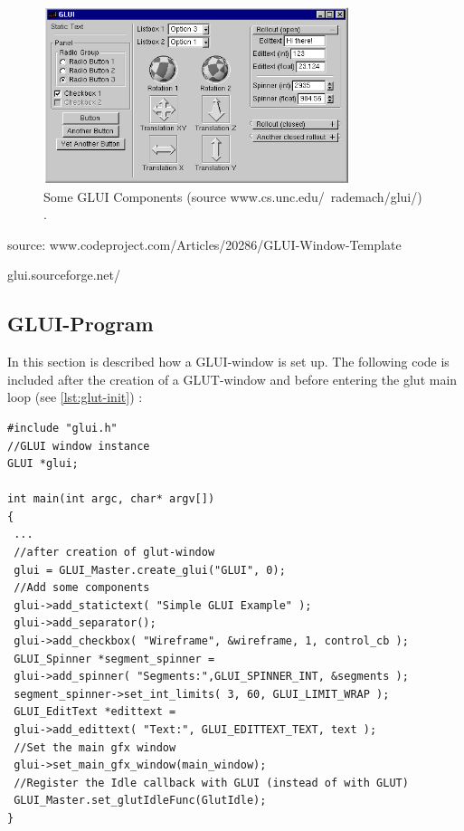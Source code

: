 \documentclass[10pt,a4paper,DIV=11]{scrreprt}
\begin{document}
\begin{center}
	\begin{figure}[H]
		\centering
		\includegraphics[width=0.8\textwidth,scale=1.0]{files/glui.png}  
		\caption{Some GLUI Components (source www.cs.unc.edu/~rademach/glui/) \cite{ogl-glui}.}
		\label{fig:ogl-glui}
	\end{figure}
\end{center}

source: www.codeproject.com/Articles/20286/GLUI-Window-Template

glui.sourceforge.net/


\subsection{GLUI-Program}
In this section is described how a GLUI-window is set up.
The following code is included after the creation of a GLUT-window and before entering the glut main loop (see \ref{lst:glut-init}) :


\begin{lstlisting}[caption={Creating a GLUI-window},label=lst:glui-create]
#include "glui.h"
//GLUI window instance
GLUI *glui;

int main(int argc, char* argv[])
{
 ...
 //after creation of glut-window
 glui = GLUI_Master.create_glui("GLUI", 0);
 //Add some components
 glui->add_statictext( "Simple GLUI Example" );
 glui->add_separator();
 glui->add_checkbox( "Wireframe", &wireframe, 1, control_cb );
 GLUI_Spinner *segment_spinner =
 glui->add_spinner( "Segments:",GLUI_SPINNER_INT, &segments );
 segment_spinner->set_int_limits( 3, 60, GLUI_LIMIT_WRAP );
 GLUI_EditText *edittext =
 glui->add_edittext( "Text:", GLUI_EDITTEXT_TEXT, text );
 //Set the main gfx window
 glui->set_main_gfx_window(main_window);
 //Register the Idle callback with GLUI (instead of with GLUT)
 GLUI_Master.set_glutIdleFunc(GlutIdle);
}
\end{lstlisting}
\end{document}
